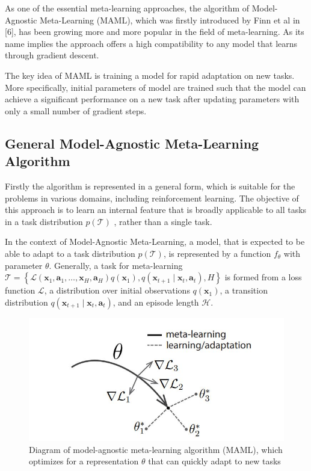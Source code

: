 As one of the essential meta-learning approaches, the algorithm of Model-Agnostic Meta-Learning (MAML), which was firstly introduced by Finn et al in [6], has been growing more and more popular in the field of meta-learning. As its name implies the approach offers a high compatibility to any model that learns through gradient descent.

The key idea of MAML is training a model for rapid adaptation on new tasks. More specifically, initial parameters of model are trained such that the model can achieve a significant performance on a new task after updating parameters with only a small number of gradient steps.

\subsection{ General Model-Agnostic Meta-Learning Algorithm}
Firstly the algorithm is represented in a general form, which is suitable for the problems in various domains, including reinforcement learning. The objective of this approach is to learn an internal feature that is broadly applicable to all tasks in a task distribution $p(\mathcal{T})$
, rather than a single task.

In the context of Model-Agnostic Meta-Learning, a model, that is expected to be able to adapt to a task distribution $p(\mathcal{T})$, is represented by a function $f_{\theta}$ with parameter $\theta$. Generally, a task for meta-learning 
$\mathcal{T}=\left\{\mathcal{L}\left(\mathbf{x}_{1}, \mathbf{a}_{1}, \ldots, \mathbf{x}_{H}, \mathbf{a}_{H}\right) q\left(\mathbf{x}_{1}\right), q\left(\mathbf{x}_{t+1} \mid \mathbf{x}_{t}, \mathbf{a}_{t}\right), H\right\}$ is formed from a loss function $\mathcal{L}$, a distribution over initial observations $q\left(\mathbf{x}_{1}\right)$, a transition distribution $q\left(\mathbf{x}_{t+1} \mid \mathbf{x}_{t}, \mathbf{a}_{t}\right)$, and
an episode length $\mathcal{H}$.

\begin{figure}[H]
	\includegraphics[scale=0.6]{MAML_01.JPG}
	\centering
	\caption{Diagram of model-agnostic meta-learning algorithm (MAML), which optimizes for a representation $\theta$ that can
    quickly adapt to new tasks}
	\label{MAML}
\end{figure}

